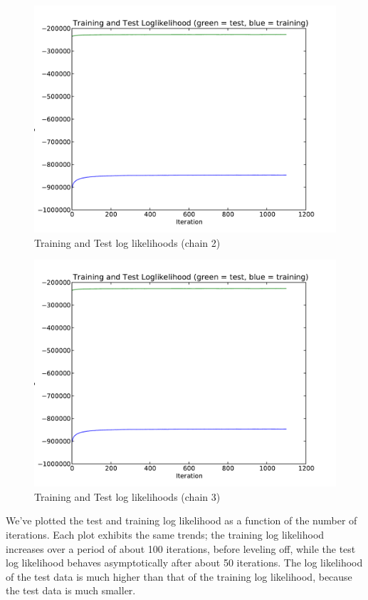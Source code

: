 \documentclass{article}
\begin{document}
\begin{figure}[H]
  \caption{Training and Test log likelihoods (chain 2)}
  \centering
    \includegraphics[width=1.0\textwidth]{q6_p1_2.pdf}
\end{figure}

\begin{figure}[H]
  \caption{Training and Test log likelihoods (chain 3)}
  \centering
    \includegraphics[width=1.0\textwidth]{q6_p1_2.pdf}
\end{figure}

We've plotted the test and training log likelihood as a function of
the number of iterations. Each plot exhibits the same trends; the training log likelihood increases over a period
of about 100 iterations, before leveling off, while the test log likelihood behaves asymptotically after about 50 iterations. The
log likelihood of the test data is much higher than that of the training log likelihood, because the test data is much smaller.
\end{document}
